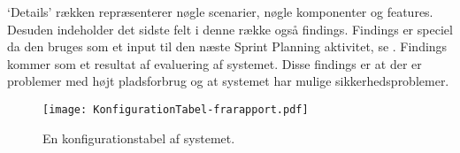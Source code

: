 `Details' rækken repræsenterer nøgle scenarier, nøgle komponenter og features.
Desuden indeholder det sidste felt i denne række også findings.
Findings er speciel da den bruges som et input til den næste Sprint Planning aktivitet, se \citet[Afsnit 8.5, Side 54]{art:essence}. 
Findings kommer som et resultat af evaluering af systemet. 
Disse findings er at der er problemer med højt pladsforbrug og at systemet har mulige sikkerhedsproblemer. 

\begin{figure}
\texttt{[image: KonfigurationTabel-frarapport.pdf]}
\caption{En konfigurationstabel af systemet.}
\label{tab:konfigurationsTabel}
\end{figure}
